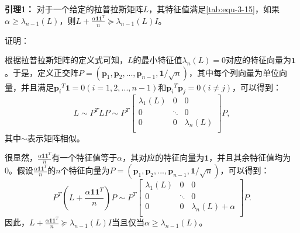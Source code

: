 \textbf{\fangsong 引理1：} 对于一个给定的拉普拉斯矩阵$L$，其特征值满足\autoref{tab:equ-3-15}，如果$\alpha \geqslant \lambda _{n-1}\left( L \right)$，则$L+\frac{\alpha \mathbf{1}\mathbf{1}^T}{n}\succcurlyeq \lambda _{n-1}\left( L \right) I$。

证明：

根据拉普拉斯矩阵的定义式可知，$L$的最小特征值$\lambda _n\left( L \right)=0$对应的特征向量为$\mathbf{1}$。于是，定义正交阵$P=\left( \boldsymbol{p}_1,\boldsymbol{p}_2,...,\boldsymbol{p}_{n-1},\mathbf{1}/\sqrt{n} \right)$，其中每个列向量为单位向量，并且满足${\boldsymbol{p}_i}^T\mathbf{1}=0\left( i=1,2,...,n-1 \right) $和${\boldsymbol{p}_i}^T\boldsymbol{p}_j=0\left( i\ne j \right) $，可以得到：
\begin{equation}
    \label{tab:equ-3-17}
    L\sim P^TLP\sim P^T\left[ \begin{matrix}
        \lambda _1\left( L \right)&		0&		0\\
        0&		\ddots&		0\\
        0&		0&		\lambda _n\left( L \right)\\
    \end{matrix} \right] P,
\end{equation}
其中$\sim$表示矩阵相似。

很显然，$\frac{\alpha \mathbf{1}\mathbf{1}^T}{n}$有一个特征值等于$\alpha$，其对应的特征向量为$\mathbf{1}$，并且其余特征值均为0。假设$\frac{\alpha \mathbf{1}\mathbf{1}^T}{n}$的$n$个特征向量为$P=\left( \boldsymbol{p}_1,\boldsymbol{p}_2,...,\boldsymbol{p}_{n-1},\mathbf{1}/\sqrt{n} \right) $，可以得到：
\begin{equation}
    \label{tab:equ-3-18}
    P^T\left( L+\frac{\alpha \mathbf{1}\mathbf{1}^T}{n} \right) P\sim P^T\left[ \begin{matrix}
        \lambda _1\left( L \right)&		0&		0\\
        0&		\ddots&		0\\
        0&		0&		\lambda _n\left( L \right) +\alpha\\
    \end{matrix} \right] P.
\end{equation}
因此，$L+\frac{\alpha \mathbf{1}\mathbf{1}^T}{n}\succcurlyeq \lambda _{n-1}\left( L \right) I$当且仅当$\alpha \geqslant \lambda _{n-1}\left( L \right)$。

